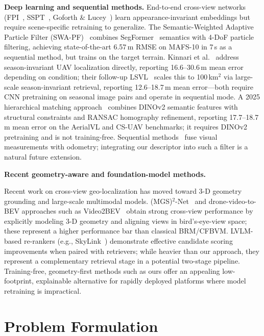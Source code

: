 \documentclass[10pt]{article}
\theoremstyle{plain}
\theoremstyle{definition}
\begin{document}
\noindent\textbf{Deep learning and sequential methods.}
End-to-end cross-view networks
(FPI~\cite{dai2022fpi}, SSPT~\cite{fan2024sspt},
Goforth \& Lucey~\cite{goforth2019gps}) learn appearance-invariant embeddings
but require scene-specific retraining to generalize.
The Semantic-Weighted Adaptive Particle Filter (SWA-PF)~\cite{yuan2025swapf}
combines SegFormer~\cite{xie2021segformer} semantics with 4-DoF particle
filtering, achieving state-of-the-art 6.57\,m RMSE on MAFS-10 in 7\,s as a
sequential method, but trains on the target terrain.
Kinnari et al.~\cite{kinnari2022season} address season-invariant UAV
localization directly, reporting 16.6--30.6\,m mean error depending on
condition; their follow-up LSVL~\cite{kinnari2023lsvl} scales this to
100\,km$^2$ via large-scale season-invariant retrieval, reporting
12.6--18.7\,m mean error---both require CNN pretraining on seasonal image
pairs and operate in sequential mode.
A 2025 hierarchical matching approach~\cite{hieruav2025} combines DINOv2
semantic features with structural constraints and RANSAC homography refinement,
reporting 17.7--18.7\,m mean error on the AerialVL and CS-UAV benchmarks;
it requires DINOv2 pretraining and is not training-free.
Sequential methods~\cite{conte2009vision,shan2015google} fuse visual
measurements with odometry; integrating our descriptor into such a filter
is a natural future extension.


\noindent\textbf{Recent geometry-aware and foundation-model methods.}
\begin{sloppypar}
Recent work on cross-view geo-localization has moved toward 3-D geometry
grounding and large-scale multimodal models.
(MGS)$^2$-Net~\cite{mgs2_2026} and drone-video-to-BEV approaches such as
Video2BEV~\cite{video2bev2024} obtain strong cross-view performance by
explicitly modeling 3-D geometry and aligning views in bird's-eye-view
space; these represent a higher performance bar than classical BRM/CFBVM.
LVLM-based re-rankers (e.g., SkyLink~\cite{skylink2026}) demonstrate
effective candidate scoring improvements when paired with retrievers;
while heavier than our approach, they represent a complementary retrieval
stage in a potential two-stage pipeline.
Training-free, geometry-first methods such as ours offer an appealing
low-footprint, explainable alternative for rapidly deployed platforms
where model retraining is impractical.
\end{sloppypar}

\section{Problem Formulation}
\label{sec:problem}
\end{document}
